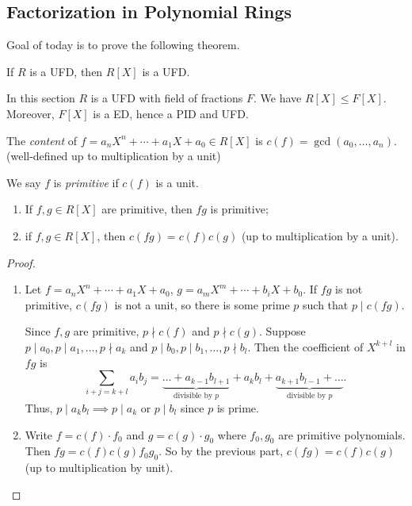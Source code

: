 \subsection{Factorization in Polynomial Rings}
Goal of today is to prove the following theorem.
\begin{theorem}{}{}
    \label{polyufd}
    If \(R\) is a UFD, then \(R[X]\) is a UFD.
\end{theorem}
In this section \(R\) is a UFD with field of fractions \(F\). We have \(R[X] \leq F[X]\). Moreover, \(F[X]\) is a ED, hence a PID and UFD.
\begin{definition}{}{}
    The \textit{content} of \(f=a_n X^n + \cdots + a_1 X + a_0 \in R[X]\) is \(c(f) = \gcd(a_0, \ldots, a_n)\). (well-defined up to multiplication by a unit)

    We say \(f\) is \textit{primitive} if \(c(f)\) is a unit.
\end{definition}
\begin{lemma}{}{}
    \label{primpoly}
    \leavevmode
    \begin{enumerate}
        \item If \(f,g \in R[X]\) are primitive, then \(fg\) is primitive;
        \item if \(f,g\in R[X]\), then \(c(fg) = c(f)c(g)\) (up to multiplication by a unit).
    \end{enumerate}
\end{lemma}
\begin{proof}
    \leavevmode
    \begin{enumerate}
        \item Let \(f = a_n X^n + \cdots + a_1 X + a_0\), \(g = a_m X^m + \cdots + b_i X + b_0\). If \(fg\) is not primitive, \(c(fg)\) is not a unit, so there is some prime \(p\) such that \(p \mid c(fg)\).
    
        Since \(f, g\) are primitive, \(p \nmid c(f)\) and \(p \nmid c(g)\). Suppose \(p \mid a_0, p \mid a_1, \ldots, p \nmid a_k\) and \(p \mid b_0, p \mid b_1, \ldots,p \nmid b_l\). Then the coefficient of \(X^{k + l}\) in \(fg\) is
        \[
            \sum_{i + j = k + l}a_{i}b_j = \underbrace{\ldots + a_{k-1}b_{l+1}}_{\text{divisible by }p} + a_{k}b_l + \underbrace{a_{k+1}b_{l-1} + \ldots}_{\text{divisible by }p}.
        \]
        Thus, \(p \mid a_k b_l \implies p \mid a_k\) or \(p \mid b_l\) since \(p\) is prime.
        \item Write \(f = c(f)\cdot f_0\) and \(g = c(g)\cdot g_0\) where \(f_0, g_0\) are primitive polynomials. Then \(fg = c(f)c(g)f_{0}g_0\). So by the previous part, \(c(fg)= c(f)c(g)\) (up to multiplication by unit).
    \end{enumerate}
\end{proof}
